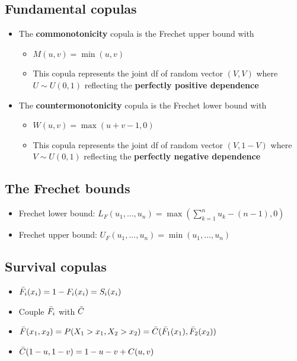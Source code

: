 \documentclass{article}
\begin{document}
\subsection{Fundamental copulas}
\begin{itemize}
    \item The \textbf{commonotonicity} copula is the Frechet upper bound with
    \begin{itemize}
        \item $M(u,v) = \min(u,v)$
        \item This copula represents the joint df of random vector $(V,V)$ where $U \sim U(0,1)$ reflecting the \textbf{perfectly positive dependence}
    \end{itemize}
    
    \item The \textbf{countermonotonicity} copula is the Frechet lower bound with
    \begin{itemize}
        \item $W(u,v) = \max(u + v - 1,0)$
        \item This copula represents the joint df of random vector $(V,1-V)$ where $V \sim U(0,1)$ reflecting the \textbf{perfectly negative dependence}
    \end{itemize}
\end{itemize}





\subsection{The Frechet bounds}
\begin{itemize}
    \item Frechet lower bound: $L_F (u_1, ..., u_n) = \max(\sum_{k=1}^n u_k - (n-1),0)$
    \item Frechet upper bound: $U_F (u_1, ..., u_n) = \min(u_1, ..., u_n)$
\end{itemize}




\subsection{Survival copulas}

\begin{itemize}
    \item $\Bar{F}_i(x_i) = 1 - F_i(x_i) = S_i(x_i)$
    \item Couple $\Bar{F}_i$ with $\Bar{C}$
    \item $\Bar{F}(x_1,x_2) = P(X_1 > x_1, X_2 > x_2) = \Bar{C}(\Bar{F}_1(x_1),\Bar{F}_2(x_2))$
    \item $\Bar{C}(1-u,1-v) = 1 - u - v + C(u,v)$
\end{itemize}
\end{document}
